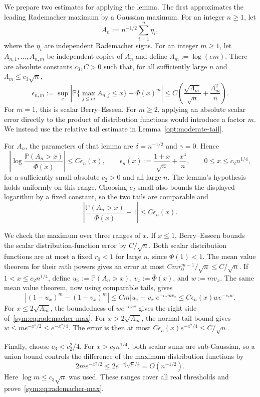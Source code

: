 \documentclass[11pt,letterpaper]{article}
\theoremstyle{remark}
\newcommand{\Pp}{\mathbb P}
\begin{document}
We prepare two estimates for applying the lemma. The first
approximates the leading Rademacher maximum by a Gaussian maximum.
For an integer $n\ge1$, let
\[
 A_n:=n^{-1/2}\sum_{i=1}^n\eta_i,
\]
where the $\eta_i$ are independent Rademacher signs. For an integer
$m\ge1$, let $A_{n,1},\ldots,A_{n,m}$ be independent copies
of $A_n$ and define $\Lambda_m:=\log(em)$. There are absolute
constants $c_3,C>0$ such that, for all sufficiently large $n$
and $\Lambda_m\le c_3\sqrt n$,
\begin{equation}
 \epsilon_{n,m}:=\sup_x\left|\Pp\{\max_{j\le m}A_{n,j}\le x\}
                         -\Phi(x)^m\right|
 \le C\left(\frac{\sqrt{\Lambda_m}}{\sqrt n}
                 +\frac{\Lambda_m^2}{n}\right).
 \label{sym:eq:rademacher-max}
\end{equation}
For $m=1$, this is scalar Berry--Esseen. For $m\ge2$, applying
an absolute scalar error directly to the product of distribution
functions would introduce a factor $m$. We instead use the
relative tail estimate in Lemma~\ref{opt:moderate-tail}.

For $A_n$, the parameters of that lemma are $\delta=n^{-1/2}$
and $\gamma=0$. Hence
\[
 \left|\log\frac{\Pp(A_n>x)}{\bar\Phi(x)}\right|
 \le C\epsilon_n(x),\qquad
 \epsilon_n(x):=\frac{1+x}{\sqrt n}+\frac{x^4}{n},
 \qquad 0\le x\le c_2n^{1/4},
\]
for a sufficiently small absolute $c_2>0$ and all large $n$.
The lemma's hypothesis holds uniformly on this range. Choosing
$c_2$ small also bounds the displayed logarithm by a fixed
constant, so the two tails are comparable and
\[
 \left|\frac{\Pp(A_n>x)}{\bar\Phi(x)}-1\right|
 \le C\epsilon_n(x).
\]

We check the maximum over three ranges of $x$. If $x\le1$,
Berry--Esseen bounds the scalar distribution-function error by
$C/\sqrt n$. Both scalar distribution functions are at most a
fixed $r_0<1$ for large $n$, since $\Phi(1)<1$.
The mean value theorem for their $m$th powers gives an error at
most $Cm r_0^{m-1}/\sqrt n\le C/\sqrt n$.
If $1<x\le c_2n^{1/4}$, define
$u_x:=\Pp(A_n>x)$, $v_x:=\bar\Phi(x)$, and $w:=mv_x$.
The same mean value theorem, now using comparable tails, gives
\[
 |(1-u_x)^m-(1-v_x)^m|
 \le Cm|u_x-v_x|e^{-c_*mv_x}
 \le C\epsilon_n(x)w e^{-c_*w}.
\]
For $x\le2\sqrt{\Lambda_m}$, the boundedness of
$we^{-c_*w}$ gives the right side of~\eqref{sym:eq:rademacher-max}.
For $x>2\sqrt{\Lambda_m}$, the normal tail bound gives
$w\le me^{-x^2/2}\le e^{-x^2/4}$. The error is then at most
$C\epsilon_n(x)e^{-x^2/4}\le C/\sqrt n$.

Finally, choose $c_3<c_2^2/4$. For $x>c_2n^{1/4}$, both
scalar sums are sub-Gaussian, so a union bound controls the
difference of the maximum distribution functions by
\[
 2me^{-x^2/2}\le2e^{-c_2^2\sqrt n/4}=O(n^{-1/2}).
\]
Here $\log m\le c_3\sqrt n$ was used. These ranges cover all
real thresholds and prove~\eqref{sym:eq:rademacher-max}.
\end{document}
